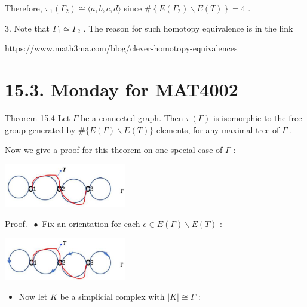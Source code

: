 Therefore, \({\pi }_{1}\left( {\Gamma }_{2}\right)  \cong  \langle a,b,c,d\rangle\) since \(\# \left\{  {E\left( {\Gamma }_{2}\right)  \smallsetminus  E\left( T\right) }\right\}   = 4\) .

3. Note that \({\Gamma }_{1} \simeq  {\Gamma }_{2}\) . The reason for such homotopy equivalence is in the link

https://www.math3ma.com/blog/clever-homotopy-equivalences

\section*{15.3. Monday for MAT4002}

Theorem 15.4 Let \(\Gamma\) be a connected graph. Then \(\pi \left( \Gamma \right)\) is isomorphic to the free group generated by \(\# \{ E\left( \Gamma \right)  \smallsetminus  E\left( T\right) \}\) elements, for any maximal tree of \(\Gamma\) .

Now we give a proof for this theorem on one special case of \(\Gamma\) :

\begin{center}
\includegraphics[max width=0.4\textwidth]{images/bo_d2bcsrref24c73avs720_147_728_630_521_185_0.jpg}
\end{center}
\hspace*{3em} 

Proof. \(\; \bullet\) Fix an orientation for each \(e \in  E\left( \Gamma \right)  \smallsetminus  E\left( T\right)\) :

\begin{center}
\includegraphics[max width=0.4\textwidth]{images/bo_d2bcsrref24c73avs720_147_704_1012_532_185_0.jpg}
\end{center}
\hspace*{3em} 

\begin{itemize}
\item Now let \(K\) be a simplicial complex with \(\left| K\right|  \cong  \Gamma\) :
\end{itemize}

